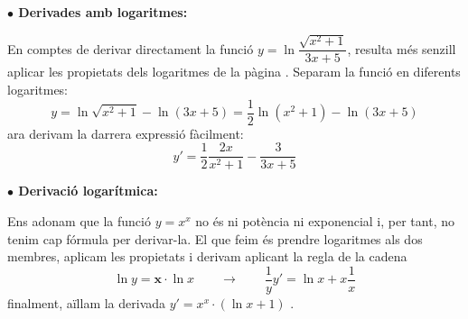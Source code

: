 	\begin{theorybox}
		
	\textbf{$\bullet$ Derivades amb logaritmes:}
	
	En comptes de derivar directament la funció $y=\ln \dfrac{\sqrt{x^2+1}}{3x+5}$, resulta més senzill aplicar les propietats dels logaritmes de la pàgina \pageref{eq:proplog}. Separam la funció en diferents logaritmes:
		\[ y=\ln\sqrt{x^2+1} -\ln (3x+5)=\frac{1}{2}\ln (x^2+1) -\ln (3x+5) \]
		ara derivam la darrera expressió fàcilment:
		\[y'=\frac{1}{2} \frac{2x}{x^2+1}  -\frac{3}{3x+5}\]
	
	\textbf{$\bullet$ Derivació logarítmica:}
	
	Ens adonam que la funció $y=x^x$ no és ni potència ni exponencial i, per tant, no tenim cap fórmula per derivar-la. El que feim és prendre logaritmes als dos membres, aplicam les propietats i derivam aplicant la regla de la cadena
			\[ \ln y= \mathbf{x} \cdot \ln x \qquad \rightarrow  \qquad \frac{1}{y} y' = \ln x + x\frac{1}{x} \]
		finalment, aïllam la derivada $y'=x^x \cdot \left(\ln x + 1 \right)$ .
		
	\end{theorybox}

